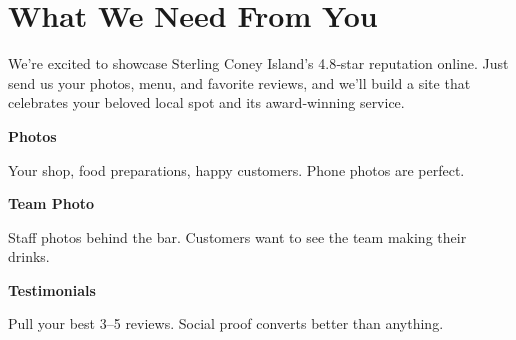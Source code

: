 \documentclass[11pt,letterpaper]{article}
\begin{document}
\vspace{0.2em}

\section*{What We Need From You}

We’re excited to showcase Sterling Coney Island’s 4.8‑star reputation online. Just send us your photos, menu, and favorite reviews, and we’ll build a site that celebrates your beloved local spot and its award‑winning service.

\vspace{0.12em}

\noindent\begin{minipage}[t]{0.48\textwidth}
\begin{tcolorbox}[colframe=accent-teal, boxrule=1pt, left=0.7em, right=0.7em, top=0.5em, bottom=0.5em, arc=4pt, boxsep=0pt]
{\bfseries\small\color{accent-teal}Photos}

\vspace{0.15em}

{\small Your shop, food preparations, happy customers. Phone photos are perfect.}
\end{tcolorbox}

\vspace{0.1em}

\begin{tcolorbox}[colframe=accent-teal, boxrule=1pt, left=0.7em, right=0.7em, top=0.5em, bottom=0.5em, arc=4pt, boxsep=0pt]
{\bfseries\small\color{accent-teal}Team Photo}

\vspace{0.15em}

{\small Staff photos behind the bar. Customers want to see the team making their drinks.}
\end{tcolorbox}

\vspace{0.1em}

\begin{tcolorbox}[colframe=accent-teal, boxrule=1pt, left=0.7em, right=0.7em, top=0.5em, bottom=0.5em, arc=4pt, boxsep=0pt]
{\bfseries\small\color{accent-teal}Testimonials}

\vspace{0.15em}

{\small Pull your best 3--5 reviews. Social proof converts better than anything.}
\end{tcolorbox}
\end{minipage}
\hfill
\end{document}
